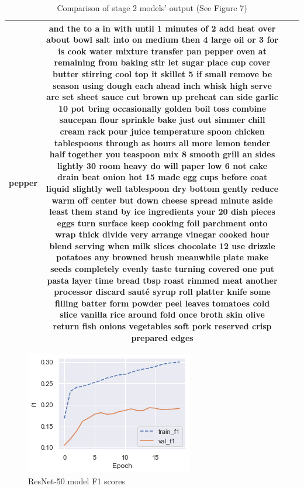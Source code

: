 \documentclass[10pt,twocolumn,letterpaper]{article}
\begin{document}
\begin{table}
\begin{tabular}{|p{2cm}|c|p{5cm}|p{7cm}|}
        pepper & and the to a in with until 1 minutes of 2 add heat over about bowl salt into on medium then 4 large oil or 3 for is cook water mixture transfer pan pepper oven at remaining from baking stir let sugar place cup cover butter stirring cool top it skillet 5 if small remove be season using dough each ahead inch whisk high serve are set sheet sauce cut brown up preheat can side garlic 10 pot bring occasionally golden boil toss combine saucepan flour sprinkle bake just out simmer chill cream rack pour juice temperature spoon chicken tablespoons through as hours all more lemon tender half together you teaspoon mix 8 smooth grill an sides lightly 30 room heavy do will paper low 6 not cake drain beat onion hot 15 made egg cups before coat liquid slightly well tablespoon dry bottom gently reduce warm off center but down cheese spread minute aside least them stand by ice ingredients your 20 dish pieces eggs turn surface keep cooking foil parchment onto wrap thick divide very arrange vinegar cooked hour blend serving when milk slices chocolate 12 use drizzle potatoes any browned brush meanwhile plate make seeds completely evenly taste turning covered one put pasta layer time bread tbsp roast rimmed meat another processor discard sauté syrup roll platter knife some filling batter form powder peel leaves tomatoes cold slice vanilla rice around fold once broth skin olive return fish onions vegetables soft pork reserved crisp prepared edges  \\
        \hline
    \end{tabular}
    \caption{Comparison of stage 2 models' output (See Figure 7)}
    \label{tab:contributions}
\end{table}

\begin{figure}[ht]
\begin{center}
   \includegraphics[width=0.8\linewidth]{resnet-f1.png}
\end{center}
\caption{ResNet-50 model F1 scores}
\label{fig:onecol}
\end{figure}
\end{document}
